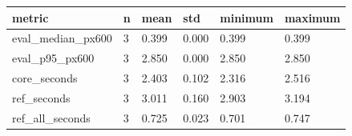 \begin{tabular}{llllll}
\hline
metric & n & mean & std & minimum & maximum \\ \hline
eval\_median\_px600 & 3 & 0.399 & 0.000 & 0.399 & 0.399 \\
eval\_p95\_px600 & 3 & 2.850 & 0.000 & 2.850 & 2.850 \\
core\_seconds & 3 & 2.403 & 0.102 & 2.316 & 2.516 \\
ref\_seconds & 3 & 3.011 & 0.160 & 2.903 & 3.194 \\
ref\_all\_seconds & 3 & 0.725 & 0.023 & 0.701 & 0.747 \\
\hline
\end{tabular}
